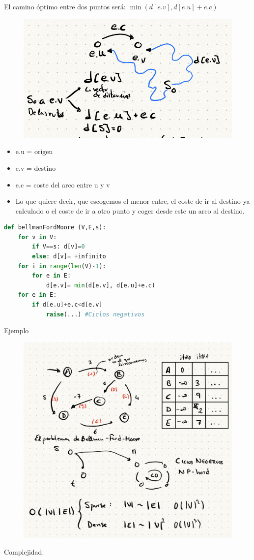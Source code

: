 \documentclass[12pt, twoside, openright]{report} %
\begin{document}
El camino óptimo entre dos puntos será: \(\min (d[e.v], d[e.u]+ e.c)\)
\begin{figure}[H]
	{\includegraphics[scale=.32]{Untitled 25.png}}
\end{figure}
\begin{itemize}
\item
  e.u = origen
\item
  e.v = destino
\item
  e.c = coste del arco entre u y v
\item
    Lo que quiere decir, que escogemos el menor entre, el coste de ir al
    destino ya calculado o el coste de ir a otro punto y coger desde
    este un arco al destino.
\end{itemize}
\begin{lstlisting}[language=Python]
def bellmanFordMoore (V,E,s):
	for v in V:
		if V==s: d[v]=0
		else: d[v]= +infinito
	for i in range(len(V)-1):
		for e in E:
			d[e.v]= min(d[e.v], d[e.u]+e.c)
	for e in E:
		if d[e.u]+e.c<d[e.v]
			raise(...) #Ciclos negativos
\end{lstlisting}

\pagebreak
Ejemplo
\begin{figure}[H]
	{\includegraphics[scale=.3]{Untitled 26.png}}
\end{figure}
Complejidad:
\end{document}
